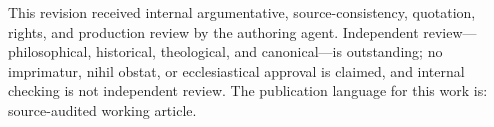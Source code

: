 This revision received internal argumentative, source-consistency, quotation, rights, and production review by the authoring agent. Independent review---philosophical, historical, theological, and canonical---is outstanding; no imprimatur, nihil obstat, or ecclesiastical approval is claimed, and internal checking is not independent review. The publication language for this work is: source-audited working article.
